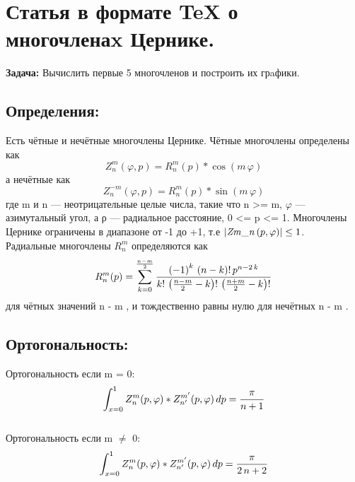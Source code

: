 \documentclass[pdf, unicode, 12pt, a4paper,oneside,fleqn]{article}
\begin{document}
\section*{Статья в формате TeX о многочленаx Цернике.}
\par\textbf{Задача:} Вычислить первые 5 многочленов и построить их грaфики.
\subsection*{Определения:}
Есть чётные и нечётные многочлены Цернике. Чётные многочлены определены как
$$Z^{m}_{n}(\varphi,p)=R^{m}_{n}(p)*\cos \left(m\,\varphi\right)$$
а нечётные как\\
$$Z^{-m}_{n}(\varphi,p)=R^{m}_{n}(p)*\sin \left(m\,\varphi\right)$$
где m и n — неотрицательные целые числа, такие что n >= m, 
    $\varphi$ — азимутальный угол, а ρ — радиальное расстояние, 0 <= p <= 1.
    Многочлены Цернике ограничены в диапазоне от -1 до +1, т.е
    $\left| {\it Zm\_n}\left(p , \varphi\right)\right| \leq 1$. \\
Радиальные многочлены $R_{n}^{m}$ определяются как\\
$$R_{n}^{m}(p)=\sum_{k=0}^{{{n-m}\over{2}}}{{{\left(-1\right)^{k}\,\left(n-k\right)!\,p^{n-2\,k}}\over{k!\,\left({{n-m}\over{2}}-k\right)!\,\left({{n+m}\over{2}}-k\right)!}}}$$
для чётных значений n - m , и тождественно равны нулю для нечётных n - m .\\
\subsection*{Ортогональность:}
Ортогональность если m = 0:\\
$$\int_{x=0}^1 Z^{m}_{n}(p,\varphi)*Z^{m'}_{n'}(p,\varphi) \,dp = {{\pi}\over{n+1}}$$\\
Ортогональность если m $\neq$ 0:\\
$$\int_{x=0}^1 Z^{m}_{n}(p,\varphi)*Z^{m'}_{n'}(p,\varphi) \,dp = {{\pi}\over{2\,n+2}}$$
\end{document}
